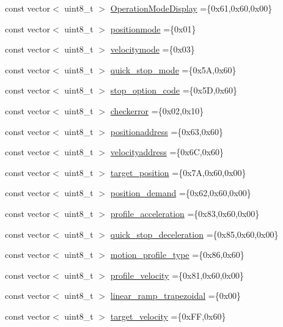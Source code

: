 \begin{DoxyCompactItemize}
\item 
const vector$<$ uint8\+\_\+t $>$ \hyperlink{namespaceod_a0469b45cd9158b638f0e0d6ed1102742}{Operation\+Mode\+Display} =\{0x61,0x60,0x00\}
\item 
const vector$<$ uint8\+\_\+t $>$ \hyperlink{namespaceod_a85efca0656a6714d7227858e112c4a73}{positionmode} =\{0x01\}
\item 
const vector$<$ uint8\+\_\+t $>$ \hyperlink{namespaceod_a2771fb30adf397c1cd2ddb092a414e82}{velocitymode} =\{0x03\}
\item 
const vector$<$ uint8\+\_\+t $>$ \hyperlink{namespaceod_ab5b4d34058d08a758277bf52cd31d8c9}{quick\+\_\+stop\+\_\+mode} =\{0x5\+A,0x60\}
\item 
const vector$<$ uint8\+\_\+t $>$ \hyperlink{namespaceod_af1bc07726906ffc6ea25ab9abb478143}{stop\+\_\+option\+\_\+code} =\{0x5\+D,0x60\}
\item 
const vector$<$ uint8\+\_\+t $>$ \hyperlink{namespaceod_ac4b980a10ae256ea019a767459b6ba9b}{checkerror} =\{0x02,0x10\}
\item 
const vector$<$ uint8\+\_\+t $>$ \hyperlink{namespaceod_a716df35f1a3cc3e1792c033be7fc0518}{positionaddress} =\{0x63,0x60\}
\item 
const vector$<$ uint8\+\_\+t $>$ \hyperlink{namespaceod_adf45781fb80275c184d548ea793b376b}{velocityaddress} =\{0x6\+C,0x60\}
\item 
const vector$<$ uint8\+\_\+t $>$ \hyperlink{namespaceod_a0bdcdb539c588cfae0d43cc0ba40ea05}{target\+\_\+position} =\{0x7\+A,0x60,0x00\}
\item 
const vector$<$ uint8\+\_\+t $>$ \hyperlink{namespaceod_a1d5963cb8a002987c96fae2e172790ee}{position\+\_\+demand} =\{0x62,0x60,0x00\}
\item 
const vector$<$ uint8\+\_\+t $>$ \hyperlink{namespaceod_aced8c17d62c0e774949057de0a99f402}{profile\+\_\+acceleration} =\{0x83,0x60,0x00\}
\item 
const vector$<$ uint8\+\_\+t $>$ \hyperlink{namespaceod_a57361a1a6b60fd8b93c2828fd7f5429f}{quick\+\_\+stop\+\_\+deceleration} =\{0x85,0x60,0x00\}
\item 
const vector$<$ uint8\+\_\+t $>$ \hyperlink{namespaceod_a5256e8439c66da9ab7ad06fa5f72ec1a}{motion\+\_\+profile\+\_\+type} =\{0x86,0x60\}
\item 
const vector$<$ uint8\+\_\+t $>$ \hyperlink{namespaceod_a47b7c8f6797cc134be5ee1d78d83ee50}{profile\+\_\+velocity} =\{0x81,0x60,0x00\}
\item 
const vector$<$ uint8\+\_\+t $>$ \hyperlink{namespaceod_a8d1e6a3e8180e5d64d68588ee182721c}{linear\+\_\+ramp\+\_\+trapezoidal} =\{0x00\}
\item 
const vector$<$ uint8\+\_\+t $>$ \hyperlink{namespaceod_a758ce0003cc482e5464959ed79c808e2}{target\+\_\+velocity} =\{0x\+F\+F,0x60\}
\end{DoxyCompactItemize}


